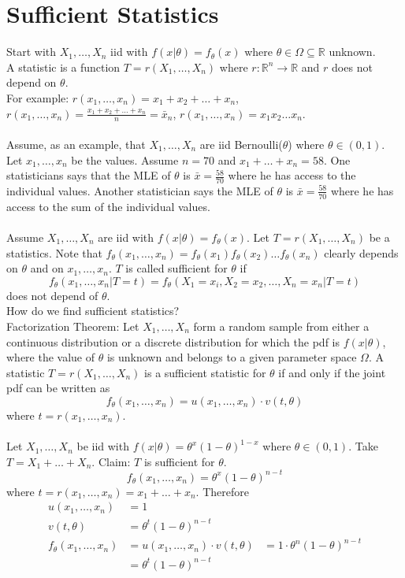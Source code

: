\documentclass[12pt]{article}
\begin{document}
\section{Sufficient Statistics} 
Start with $X_1,\dots,X_n$ iid with $f(x|\theta) = f_{\theta}(x)$ where $\theta \in \Omega \subseteq \mathbb{R}$ unknown. \\
A statistic is a function $T = r(X_1,\dots,X_n)$ where $r:\mathbb{R}^n \to \mathbb{R}$ and $r$ does not depend on $\theta$. \\
For example: $r(x_1,\dots,x_n) = x_1+x_2+\dots+x_n$, $r(x_1,\dots,x_n) = \frac{x_1+x_2+\dots+x_n}{n} = \bar{x}_n$, $r(x_1,\dots,x_n) = x_1x_2\dots x_n$. \\~\\
Assume, as an example, that $X_1,\dots,X_n$ are iid Bernoulli($\theta$) where $\theta \in (0,1)$. Let $x_1,\dots,x_n$ be the values. Assume $n=70$ and $x_1+\dots+x_n = 58$. One statisticians says that the MLE of $\theta$ is $\bar{x} = \frac{58}{70}$ where he has access to the individual values. Another statistician says the MLE of $\theta$ is $\bar{x} = \frac{58}{70}$ where he has access to the sum of the individual values.\\~\\
Assume $X_1,\dots,X_n$ are iid with $f(x|\theta) = f_\theta(x)$. Let $T = r(X_1,\dots,X_n)$ be a statistics. Note that $f_\theta(x_1,\dots,x_n) = f_\theta(x_1)f_\theta(x_2)\dots f_\theta(x_n)$ clearly depends on $\theta$ and on $x_1,\dots,x_n$. $T$ is called sufficient for $\theta$ if $$f_\theta(x_1,\dots,x_n | T=t) = f_\theta(X_1=x_i,X_2=x_2,\dots,X_n=x_n | T=t) $$ does not depend of $\theta$. \\
How do we find sufficient statistics? \\
Factorization Theorem: Let $X_1,\dots,X_n$ form a random sample from either a continuous distribution or a discrete distribution for which the pdf is $f (x|\theta)$, where the value of $\theta$ is unknown and belongs to a given parameter space $\Omega$. A statistic $T = r(X_1,\dots,X_n)$ is a sufficient statistic for $\theta$ if and only if the joint pdf can be written as $$f_\theta(x_1,\dots,x_n) = u(x_1,\dots,x_n)\cdot v(t,\theta)$$ where $t = r(x_1,\dots,x_n)$. \\~\\
Let $X_1,\dots,X_n$ be iid with $f(x|\theta) = \theta^x(1-\theta)^{1-x}$ where $\theta \in (0,1)$. Take $T=X_1+\dots+X_n$. Claim: $T$ is sufficient for $\theta$. $$f_{\theta}(x_1,\dots,x_n) = \theta^x(1-\theta)^{n-t} $$ where $t = r(x_1,\dots,x_n) = x_1+\dots+x_n$. Therefore $$\begin{aligned} u(x_1,\dots,x_n) &= 1 \\ v(t,\theta) &= \theta^t(1-\theta)^{n-t} \\ f_{\theta}(x_1,\dots,x_n) &= u(x_1,\dots,x_n)\cdot v(t,\theta) &= 1 \cdot \theta^n(1-\theta)^{n-t} \\ &= \theta^t(1-\theta)^{n-t} \end{aligned} $$ 
\end{document}

